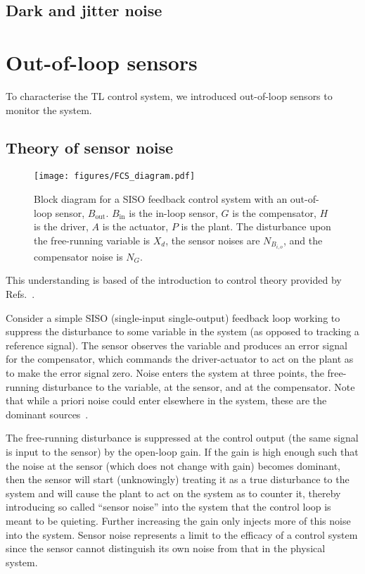 \documentclass[aps,pra,superscriptaddress,reprint,nofootinbib]{revtex4-1}
\begin{document}

\subsection{Dark and jitter noise}



\section{Out-of-loop sensors}
\label{sec:out-of-loop_sensors}

To characterise the TL control system, we introduced out-of-loop sensors to monitor the system.

\subsection{Theory of sensor noise}

\begin{figure}
	\texttt{[image: figures/FCS\_diagram.pdf]}
	\caption{Block diagram for a SISO feedback control system with an out-of-loop sensor, $B_{\mathrm{out}}$. $B_{\mathrm{in}}$ is the in-loop sensor, $G$ is the compensator, $H$ is the driver, $A$ is the actuator, $P$ is the plant. The disturbance upon the free-running variable is $X_d$, the sensor noises are $N_{B_{i,o}}$, and the compensator noise is $N_G$.}
\end{figure}


This understanding is based of the introduction to control theory provided by Refs.~\cite{Ward:2010,Bechhoefer:2005,FCS:2000}.


Consider a simple SISO (single-input single-output) feedback loop working to suppress the disturbance to some variable in the system (as opposed to tracking a reference signal). The sensor observes the variable and produces an error signal for the compensator, which commands the driver-actuator to act on the plant as to make the error signal zero. Noise enters the system at three points, the free-running disturbance to the variable, at the sensor, and at the compensator. Note that while a priori noise could enter elsewhere in the system, these are the dominant sources~\cite{FCS:2000}. 


The free-running disturbance is suppressed at the control output (the same signal is input to the sensor) by the open-loop gain. If the gain is high enough such that the noise at the sensor (which does not change with gain) becomes dominant, then the sensor will start (unknowingly) treating it as a true disturbance to the system and will cause the plant to act on the system as to counter it, thereby introducing so called ``sensor noise'' into the system that the control loop is meant to be quieting. Further increasing the gain only injects more of this noise into the system. Sensor noise represents a limit to the efficacy of a control system since the sensor cannot distinguish its own noise from that in the physical system.
\end{document}
